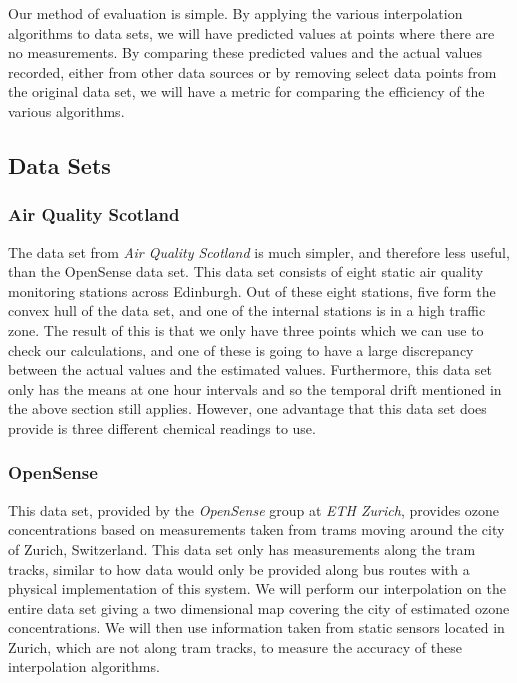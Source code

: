 		Our method of evaluation is simple. By applying the various interpolation algorithms to data sets, we will have predicted values at points where there are no measurements. By comparing these predicted values and the actual values recorded, either from other data sources or by removing select data points from the original data set, we will have a metric for comparing the efficiency of the various algorithms. 

		\subsection{Data Sets}\label{prediction_evaluation_methodology_data_sets}


			\subsubsection{Air Quality Scotland}\label{prediction_evaluation_methodology_data_sets_air_quality_scotland}

				The data set from \emph{Air Quality Scotland} is much simpler, and therefore less useful, than the OpenSense data set. This data set consists of eight static air quality monitoring stations across Edinburgh. Out of these eight stations, five form the convex hull of the data set, and one of the internal stations is in a high traffic zone. The result of this is that we only have three points which we can use to check our calculations, and one of these is going to have a large discrepancy between the actual values and the estimated values. Furthermore, this data set only has the means at one hour intervals and so the temporal drift mentioned in the above section still applies. However, one advantage that this data set does provide is three different chemical readings to use. 

			\subsubsection{OpenSense}\label{prediction_evaluation_methodology_data_sets_opensense}

				This data set, provided by the \emph{OpenSense} group at \emph{ETH Zurich}, provides ozone concentrations based on measurements taken from trams moving around the city of Zurich, Switzerland. This data set only has measurements along the tram tracks, similar to how data would only be provided along bus routes with a physical implementation of this system. We will perform our interpolation on the entire data set giving a two dimensional map covering the city of estimated ozone concentrations. We will then use information taken from static sensors located in Zurich, which are not along tram tracks, to measure the accuracy of these interpolation algorithms. 


